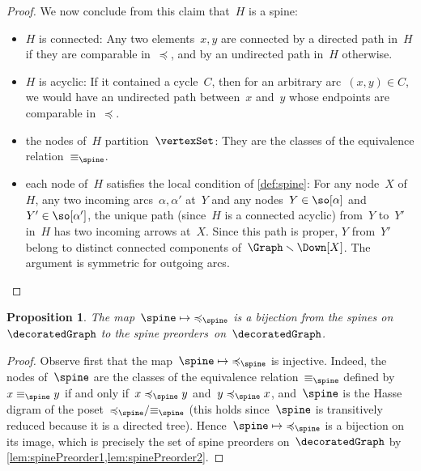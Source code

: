 \documentclass{amsart}
\newtheorem{proposition}[theorem]{Proposition}
\theoremstyle{definition}
\newcommand{\ssm}{\smallsetminus} %
\begin{document}
\begin{proof}
  We now conclude from this claim that~$H$ is a spine:
  \begin{itemize}
    \item $H$ is connected: Any two elements~$x,y$ are connected by a directed path in~$H$ if they are comparable in~$\preccurlyeq$, and by an undirected path in~$H$ otherwise.
    \item $H$ is acyclic: If it contained a cycle~$C$, then for an arbitrary arc~$(x,y) \in C$, we would have an undirected path between~$x$ and~$y$ whose endpoints are comparable in~$\preccurlyeq$.
    \item the nodes of~$H$ partition~$\vertexSet$: They are the classes of the equivalence relation~$\equiv_{\spine}$.
    \item each node of~$H$ satisfies the local condition of \cref{def:spine}: For any node~$X$ of~$H$, any two incoming arcs~$\alpha, \alpha'$ at~$Y$ and any nodes~$Y \in \so[\alpha]$ and~$Y' \in \so[\alpha']$, the unique path (since~$H$ is a connected acyclic) from~$Y$ to~$Y'$ in~$H$ has two incoming arrows at~$X$. Since this path is proper, $Y$ from~$Y'$ belong to distinct connected components of~$\Graph \ssm \Down[X]$. The argument is symmetric for outgoing arcs.
    \qedhere
  \end{itemize}
\end{proof}

\begin{proposition}
  \label{prop:spinePreorder}
  The map~$\spine \mapsto {\preccurlyeq_{\spine}}$ is a bijection from the spines on~$\decoratedGraph$ to the spine preorders~on~$\decoratedGraph$.
\end{proposition}

\begin{proof}
  Observe first that the map~$\spine \mapsto {\preccurlyeq_{\spine}}$ is injective.
  Indeed, the nodes of~$\spine$ are the classes of the equivalence relation~$\equiv_{\spine}$ defined by~$x \equiv_{\spine} y$ if and only if~$x \preccurlyeq_{\spine} y$ and~$y \preccurlyeq_{\spine} x$, and~$\spine$ is the Hasse digram of the poset~${\preccurlyeq_{\spine}} / {\equiv_{\spine}}$ (this holds since~$\spine$ is transitively reduced because it is a directed tree).
  Hence~$\spine \mapsto {\preccurlyeq_{\spine}}$ is a bijection on its image, which is precisely the set of spine preorders on~$\decoratedGraph$ by \cref{lem:spinePreorder1,lem:spinePreorder2}.
\end{proof}

\end{document}
